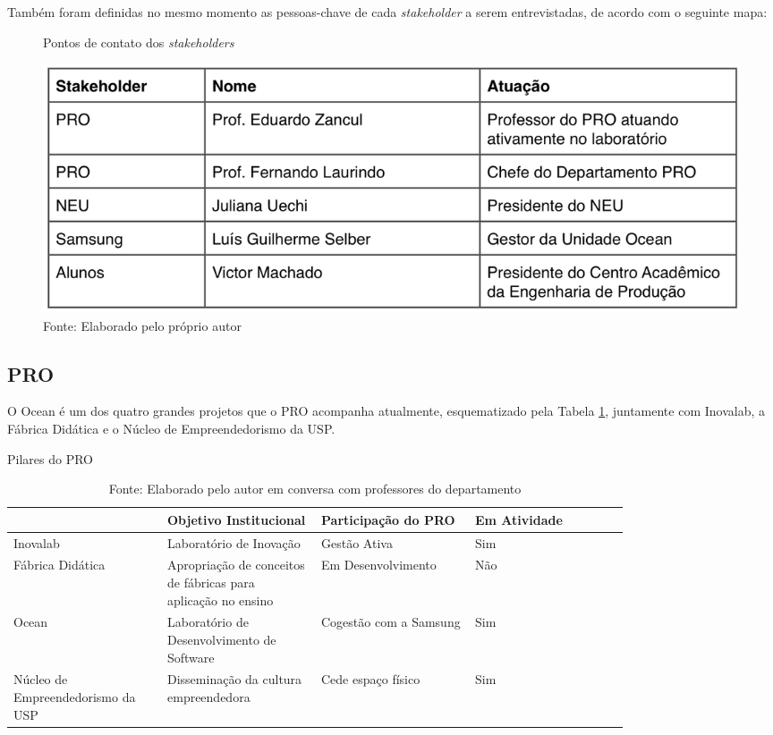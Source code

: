 Também foram definidas no mesmo momento as pessoas-chave de cada \textit{stakeholder} a serem entrevistadas, de acordo com o seguinte mapa:

\begin{figure}[H]
\caption{Pontos de contato dos \textit{stakeholders}}
\centerline{\includegraphics[scale=0.6]{img/stakeholderspoc}}
\label{fig:stakeholderspoc}
\caption* {Fonte: Elaborado pelo próprio autor}
\end{figure}


\subsection{PRO}
\label{sec:con_pro}

O Ocean é um dos quatro grandes projetos que o PRO acompanha atualmente, esquematizado pela Tabela \ref{tab:pilares_pro}, juntamente com Inovalab, a Fábrica Didática e o Núcleo de Empreendedorismo da USP.

\begin{table}[H]
\begin{center}
\caption{Pilares do PRO}
\label{tab:pilares_pro}
{\def\arraystretch{2}\tabcolsep=10pt
\begin{tabular}{>{\raggedright}p{0.2\linewidth}>{\raggedright\arraybackslash}p{0.2\linewidth}>{\raggedright\arraybackslash}p{0.2\linewidth}>{\raggedright\arraybackslash}p{0.2\linewidth}}
\hline
     & Objetivo Institucional & Participação do PRO & Em Atividade  \\ \hline
     Inovalab & Laboratório de Inovação & Gestão Ativa & Sim  \\
     Fábrica Didática & Apropriação de conceitos de fábricas para aplicação no ensino & Em Desenvolvimento & Não \\
     Ocean & Laboratório de Desenvolvimento de Software & Cogestão com a Samsung & Sim \\
	 Núcleo de Empreendedorismo da USP & Disseminação da cultura empreendedora & Cede espaço físico & Sim \\ \hline
\end{tabular}%
}
\caption* {Fonte: Elaborado pelo autor em conversa com professores do departamento}
\end{center}
\end{table}

